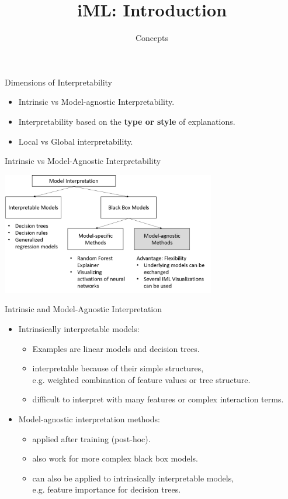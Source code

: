 \documentclass[aspectratio=169]{../latex_main/tntbeamer}  %
\title[Introduction]{iML: Introduction}
\subtitle{Concepts}
\begin{document}
	
	\maketitle

\begin{frame}[c]{Dimensions of Interpretability}
	\begin{itemize}
		\itemsep2em
		\item 
		Intrinsic vs Model-agnostic Interpretability.
		
		\item 
		Interpretability based on the \textbf{type or style} of explanations.
		
		\item 
		Local vs Global interpretability.
		
	\end{itemize}
\end{frame}


\begin{frame}[c]{Intrinsic vs Model-Agnostic Interpretability}
	\begin{center}
		\includegraphics[width=0.7\textwidth]{figure/overview}
	\end{center}
\end{frame}


\begin{frame}[c]{Intrinsic and Model-Agnostic Interpretation}
	\begin{itemize}
		\item Intrinsically interpretable models:
		\begin{itemize}
			\item Examples are linear models and decision trees.
			\item interpretable because of their simple structures,\\ 
			e.g. weighted combination of feature values or tree structure. 
			\item difficult to interpret with many features or complex interaction terms.
		\end{itemize}
	\bigskip
	\pause
		\item Model-agnostic interpretation methods:
		\begin{itemize}
			\item applied after training (post-hoc).
			\item also work for more complex black box models.
			\item can also be applied to intrinsically interpretable models,\\ 
			e.g. feature importance for decision trees. 
		\end{itemize}
	\end{itemize}
\end{frame}
\end{document}
